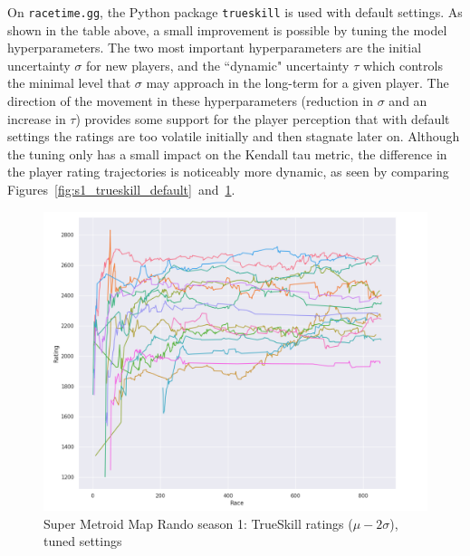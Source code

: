 \documentclass{article}
\begin{document}
	On \texttt{racetime.gg}, the Python package \texttt{trueskill} is used with default settings. As shown in the table above, a small improvement is possible by tuning the model hyperparameters. The two most important hyperparameters are the initial uncertainty $\sigma$ for new players, and the ``dynamic" uncertainty $\tau$ which controls the minimal level that $\sigma$ may approach in the long-term for a given player. The direction of the movement in these hyperparameters (reduction in $\sigma$ and an increase in $\tau$) provides some support for the player perception that with default settings the ratings are too volatile initially and then stagnate later on. Although the tuning only has a small impact on the Kendall tau metric, the difference in the player rating trajectories is noticeably more dynamic, as seen by comparing Figures~\ref{fig:s1_trueskill_default}~and~\ref{fig:s1_trueskill_tuned}.
	
	\begin{figure}
	\centering
	\includegraphics[width=0.75\linewidth]{figures/s1_trueskill_tuned.png}
	\caption{Super Metroid Map Rando season 1: TrueSkill ratings ($\mu - 2\sigma$), tuned settings}
	\label{fig:s1_trueskill_tuned}
	\end{figure}
	
\end{document}
